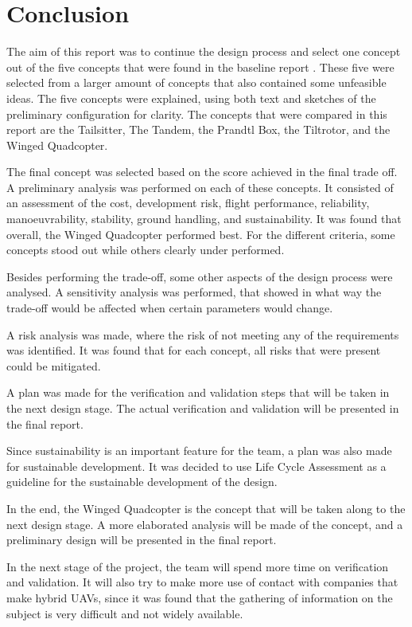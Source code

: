 \chapter{Conclusion}


The aim of this report was to continue the design process and select one concept out of the five concepts that were found in the baseline report \cite{baseline}. These five were selected from a larger amount of concepts that also contained some unfeasible ideas. The five concepts were explained, using both text and sketches of the preliminary configuration for clarity. The concepts that were compared in this report are the Tailsitter, The Tandem, the Prandtl Box, the Tiltrotor, and the Winged Quadcopter.

The final concept was selected based on the score achieved in the final trade off. A preliminary analysis was performed on each of these concepts. It consisted of an assessment of the cost, development risk, flight performance, reliability, manoeuvrability, stability, ground handling, and sustainability. %
It was found that overall, the Winged Quadcopter performed best. 
For the different criteria, some concepts stood out while others clearly under performed. 


Besides performing the trade-off, some other aspects of the design process were analysed. A sensitivity analysis was performed, that showed in what way the trade-off would be affected when certain parameters would change.


A risk analysis was made, where the risk of not meeting any of the requirements was identified. It was found that for each concept, all risks that were present could be mitigated. 


A plan was made for the verification and validation steps that will be taken in the next design stage. The actual verification and validation will be presented in the final report.


Since sustainability is an important feature for the team, a plan was also made for sustainable development. It was decided to use Life Cycle Assessment as a guideline for the sustainable development of the design.

In the end, the Winged Quadcopter is the concept that will be taken along to the next design stage. A more elaborated analysis will be made of the concept, and a preliminary design will be presented in the final report.



In the next stage of the project, the team will spend more time on verification and validation. It will also try to make more use of contact with companies that make hybrid UAVs, since it was found that the gathering of information on the subject is very difficult and not widely available.










